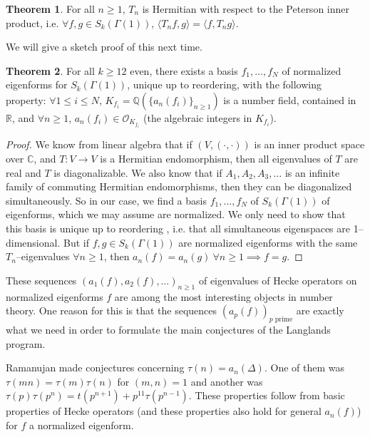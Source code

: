 \documentclass{article}
\theoremstyle{definition}
\newtheorem{theorem}{Theorem}[section]
\begin{document}
\begin{theorem}\label{theorem3.15}
    For all $n\ge 1$, $T_n$ is Hermitian with respect to the Peterson inner product, i.e. $\forall f,g \in S_k(\Gamma(1))$, $\langle T_n f, g \rangle = \langle f, T_n g \rangle$.
\end{theorem}
We will give a sketch proof of this next time.

\begin{theorem}
    For all $k\ge 12$ even, there exists a basis $f_1,\ldots,f_N$ of normalized eigenforms for $S_k(\Gamma(1))$, unique up to reordering, with the following property: $\forall 1\le i\le N$, $K_{f_i} = \mathbb{Q}(\{a_n(f_i)\}_{n\ge 1})$ is a number field, contained in $\mathbb{R}$, and $\forall n\ge 1$, $a_n(f_i) \in \mathcal{O}_{K_{f_i}}$ (the algebraic integers in $K_{f_i}$).
\end{theorem}
\begin{proof}
    We know from linear algebra that if $(V, (\cdot ,\cdot ))$ is an inner product space over $\mathbb{C}$, and $T: V \to V$ is a Hermitian endomorphism, then all eigenvalues of $T$ are real and $T$ is diagonalizable. We also know that if $A_1,A_2,A_3,\ldots$ is an infinite family of commuting Hermitian endomorphisms, then they can be diagonalized simultaneously. So in our case, we find a basis $f_1,\ldots,f_N$ of $S_k(\Gamma(1))$ of eigenforms, which we may assume are normalized. We only need to show that this basis is unique up to reordering , i.e. that all simultaneous eigenspaces are 1--dimensional. But if $f,g \in S_k(\Gamma(1))$ are normalized eigenforms with the same $T_n$--eigenvalues $\forall n\ge 1$, then $a_n(f)=a_n(g) ~\forall n\ge 1 \implies f = g$.
\end{proof}


These sequences $(a_1(f), a_2(f),\ldots)_{n\ge 1}$ of eigenvalues of Hecke operators on normalized eigenforms $f$ are among the most interesting objects in number theory. One reason for this is that the sequences $(a_p(f))_{p \text{ prime}}$ are exactly what we need in order to formulate the main conjectures of the Langlands program.
\vspace{1mm}
 
Ramanujan made conjectures concerning $\tau(n)=a_n(\Delta)$. One of them was $\tau(mn)=\tau(m)\tau(n)$ for $(m,n)=1$ and another was $\tau(p)\tau(p^{n}) = t(p^{n+1}) + p^{11} \tau(p^{n-1})$. These properties follow from basic properties of Hecke operators (and these properties also hold for general $a_n(f)$) for $f$ a normalized eigenform.
\vspace{1mm}
 
\end{document}

